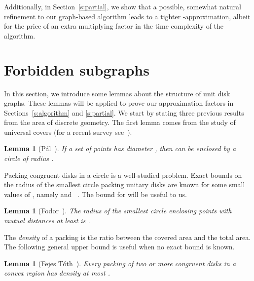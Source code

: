 \documentclass[preprint,12pt]{elsarticle}
\newtheorem{lem}[thm]{Lemma}
\begin{document}
Additionally, in Section~\ref{s:partial}, we show that a possible, somewhat natural refinement to our graph-based algorithm leads to a tighter -approximation, albeit for the price of an extra  multiplying factor in the time complexity of the algorithm.


\section{Forbidden subgraphs} \label{s:forbidden}

In this section, we introduce some lemmas about the structure of unit disk graphs. These lemmas will be applied to prove our approximation factors in Sections~\ref{s:algorithm} and \ref{s:partial}. We start by stating three previous results from the area of discrete geometry. The first lemma comes from the study of universal covers  (for a recent survey see~\cite{constants}).
\begin{lem}[P\'al~\cite{pal}]\label{l:universal_cover}
If a set of points  has diameter , then  can be enclosed by a circle of radius .
\end{lem}

Packing congruent disks in a circle is a well-studied problem. Exact bounds on the radius of the smallest circle packing  unitary disks are known for some small values of , namely  and ~\cite{Fodor}. The bound for  will be useful to us.
\begin{lem}[Fodor~\cite{Fodor}]\label{l:pack13}
The radius of the smallest circle enclosing  points with mutual distances at least  is .
\end{lem}

The \emph{density} of a packing is the ratio between the covered area and the total area. The following general upper bound is useful when no exact bound is known.
\begin{lem}[Fejes T\'oth~\cite{density}]\label{l:density}
Every packing of two or more congruent disks in a convex region has density at most .
\end{lem}
\end{document}
